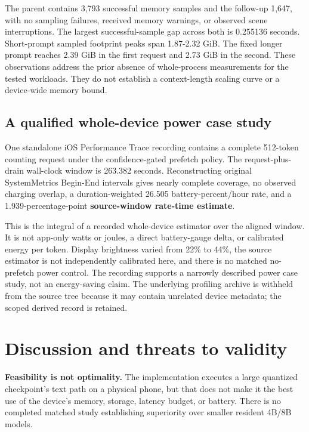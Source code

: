 \documentclass[11pt]{article}
\begin{document}
The parent contains 3,793 successful memory samples and
the follow-up 1,647, with no sampling failures, received
memory warnings, or observed scene interruptions. The largest
successful-sample gap across both is 0.255136 seconds. Short-prompt
sampled footprint peaks span 1.87-2.32 GiB.
The fixed longer prompt reaches 2.39 GiB in the first
request and 2.73 GiB in the second. These observations
address the prior absence of whole-process measurements for the tested
workloads. They do not establish a context-length scaling curve or a
device-wide memory bound.

\hypertarget{a-qualified-whole-device-power-case-study}{%
\subsection{A qualified whole-device power case study}\label{a-qualified-whole-device-power-case-study}}

One standalone iOS Performance Trace recording contains a complete
512-token counting request under the confidence-gated prefetch policy.
The request-plus-drain wall-clock window is 263.382 seconds.
Reconstructing original SystemMetrics Begin-End intervals gives nearly
complete coverage, no observed charging overlap, a duration-weighted
26.505 battery-percent/hour rate, and a
1.939-percentage-point \textbf{source-window rate-time estimate}.

This is the integral of a recorded whole-device estimator over the aligned
window. It is not app-only watts or joules, a direct battery-gauge delta,
or calibrated energy per token. Display brightness varied from 22\% to
44\%, the source estimator is not independently calibrated here, and there
is no matched no-prefetch power control. The recording supports a narrowly
described power case study, not an energy-saving claim. The underlying
profiling archive is withheld from the source tree because it may contain
unrelated device metadata; the scoped derived record is retained.

\hypertarget{discussion-and-threats-to-validity}{%
\section{Discussion and threats to validity}\label{discussion-and-threats-to-validity}}

\textbf{Feasibility is not optimality.} The implementation executes a large
quantized checkpoint's text path on a physical phone, but that does not
make it the best use of the device's memory, storage, latency budget, or
battery. There is no completed matched study establishing superiority
over smaller resident 4B/8B models.
\end{document}

